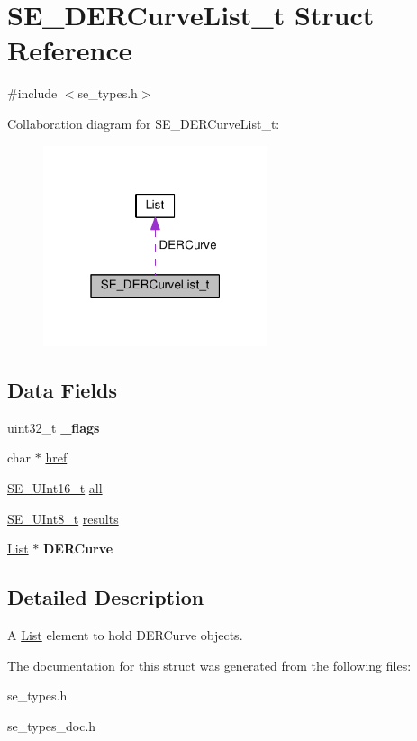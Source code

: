 \hypertarget{structSE__DERCurveList__t}{}\section{S\+E\+\_\+\+D\+E\+R\+Curve\+List\+\_\+t Struct Reference}
\label{structSE__DERCurveList__t}


{\ttfamily \#include $<$se\+\_\+types.\+h$>$}



Collaboration diagram for S\+E\+\_\+\+D\+E\+R\+Curve\+List\+\_\+t\+:\nopagebreak
\begin{figure}[H]
\begin{center}
\leavevmode
\includegraphics[width=187pt]{structSE__DERCurveList__t__coll__graph}
\end{center}
\end{figure}
\subsection*{Data Fields}
\begin{DoxyCompactItemize}
\item 
uint32\+\_\+t {\bfseries \+\_\+flags}
\item 
char $\ast$ \hyperlink{group__DERCurveList_ga6c40f574e49a75c46718995d9bddad2b}{href}
\item 
\hyperlink{group__UInt16_gac68d541f189538bfd30cfaa712d20d29}{S\+E\+\_\+\+U\+Int16\+\_\+t} \hyperlink{group__DERCurveList_gae5f34a94cb9aea726f86402b5bba15a5}{all}
\item 
\hyperlink{group__UInt8_gaf7c365a1acfe204e3a67c16ed44572f5}{S\+E\+\_\+\+U\+Int8\+\_\+t} \hyperlink{group__DERCurveList_ga66af910e33eb63a39319b0e525723987}{results}
\item 
\hyperlink{structList}{List} $\ast$ {\bfseries D\+E\+R\+Curve}
\end{DoxyCompactItemize}


\subsection{Detailed Description}
A \hyperlink{structList}{List} element to hold D\+E\+R\+Curve objects. 

The documentation for this struct was generated from the following files\+:\begin{DoxyCompactItemize}
\item 
se\+\_\+types.\+h\item 
se\+\_\+types\+\_\+doc.\+h\end{DoxyCompactItemize}
